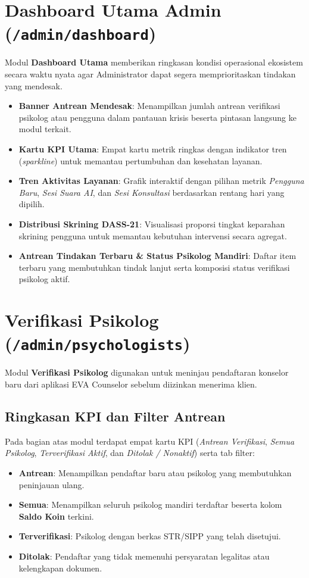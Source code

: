 \section{Dashboard Utama Admin (\texttt{/admin/dashboard})}
Modul \textbf{Dashboard Utama} memberikan ringkasan kondisi operasional ekosistem secara waktu nyata agar Administrator dapat segera memprioritaskan tindakan yang mendesak.

\begin{itemize}[leftmargin=1.4em]
  \item \textbf{Banner Antrean Mendesak}: Menampilkan jumlah antrean verifikasi psikolog atau pengguna dalam pantauan krisis beserta pintasan langsung ke modul terkait.
  \item \textbf{Kartu KPI Utama}: Empat kartu metrik ringkas dengan indikator tren (\textit{sparkline}) untuk memantau pertumbuhan dan kesehatan layanan.
  \item \textbf{Tren Aktivitas Layanan}: Grafik interaktif dengan pilihan metrik \textit{Pengguna Baru}, \textit{Sesi Suara AI}, dan \textit{Sesi Konsultasi} berdasarkan rentang hari yang dipilih.
  \item \textbf{Distribusi Skrining DASS-21}: Visualisasi proporsi tingkat keparahan skrining pengguna untuk memantau kebutuhan intervensi secara agregat.
  \item \textbf{Antrean Tindakan Terbaru \& Status Psikolog Mandiri}: Daftar item terbaru yang membutuhkan tindak lanjut serta komposisi status verifikasi psikolog aktif.
\end{itemize}


\section{Verifikasi Psikolog (\texttt{/admin/psychologists})}
Modul \textbf{Verifikasi Psikolog} digunakan untuk meninjau pendaftaran konselor baru dari aplikasi EVA Counselor sebelum diizinkan menerima klien.

\subsection{Ringkasan KPI dan Filter Antrean}
Pada bagian atas modul terdapat empat kartu KPI (\textit{Antrean Verifikasi}, \textit{Semua Psikolog}, \textit{Terverifikasi Aktif}, dan \textit{Ditolak / Nonaktif}) serta tab filter:
\begin{itemize}[leftmargin=1.4em]
  \item \textbf{Antrean}: Menampilkan pendaftar baru atau psikolog yang membutuhkan peninjauan ulang.
  \item \textbf{Semua}: Menampilkan seluruh psikolog mandiri terdaftar beserta kolom \textbf{Saldo Koin} terkini.
  \item \textbf{Terverifikasi}: Psikolog dengan berkas STR/SIPP yang telah disetujui.
  \item \textbf{Ditolak}: Pendaftar yang tidak memenuhi persyaratan legalitas atau kelengkapan dokumen.
\end{itemize}

